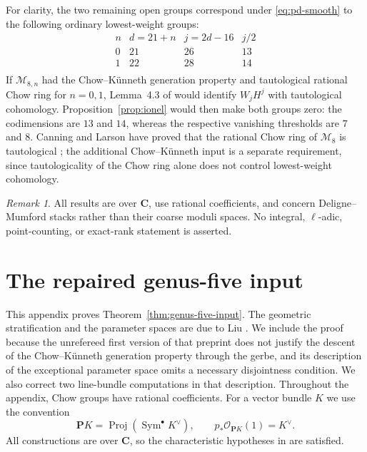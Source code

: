 \documentclass[12pt,reqno]{amsart}
\newcommand{\C}{\mathbf{C}}
\newcommand{\M}{\mathcal{M}}
\theoremstyle{definition}
\theoremstyle{remark}
\newtheorem{remark}[theorem]{Remark}
\begin{document}
For clarity, the two remaining open groups correspond under
\eqref{eq:pd-smooth} to the following ordinary lowest-weight groups:
\begin{equation}\label{eq:genus8-table}
\begin{array}{c|ccc}
n&d=21+n&j=2d-16&j/2\\ \hline
0&21&26&13\\
1&22&28&14\\
\end{array}
\end{equation}
If $\M_{8,n}$ had the Chow--K\"unneth generation property and tautological
rational Chow ring for $n=0,1$, Lemma~4.3 of \cite{CLP} would identify
$W_jH^j$ with tautological cohomology.  Proposition~\ref{prop:ionel} would
then make both groups zero: the codimensions are $13$ and $14$, whereas the
respective vanishing thresholds are $7$ and $8$.  Canning and
Larson have proved that the rational Chow ring of $\M_8$ is tautological
\cite{CanningLarson789}; the additional Chow--K\"unneth input is a separate
requirement, since tautologicality of the Chow ring alone does not control
lowest-weight cohomology.

\begin{remark}\label{rem:scope}
All results are over $\C$, use rational coefficients, and concern
Deligne--Mumford stacks rather than their coarse moduli spaces.  No integral,
$\ell$-adic, point-counting, or exact-rank statement is asserted.
\end{remark}

\appendix

\section{The repaired genus-five input}\label{app:genus-five}

This appendix proves Theorem~\ref{thm:genus-five-input}.  The geometric
stratification and the parameter spaces are due to Liu \cite[Sections~2--3]{Liu}.
We include the proof because the unrefereed first version of that preprint does not justify
the descent of the Chow--K\"unneth generation property through the gerbe, and
its description of the exceptional parameter space omits a necessary
disjointness condition.  We also correct two line-bundle computations in that
description.  Throughout the appendix, Chow groups have rational coefficients.
For a vector bundle $K$ we use the convention
\[
 \mathbf P K=\operatorname{Proj}(\operatorname{Sym}^{\bullet}K^\vee),
 \qquad p_*\mathcal O_{\mathbf P K}(1)=K^\vee.
\]
All constructions are over $\C$, so the characteristic hypotheses in
\cite{Liu,CanningLarsonStable} are satisfied.
\end{document}
